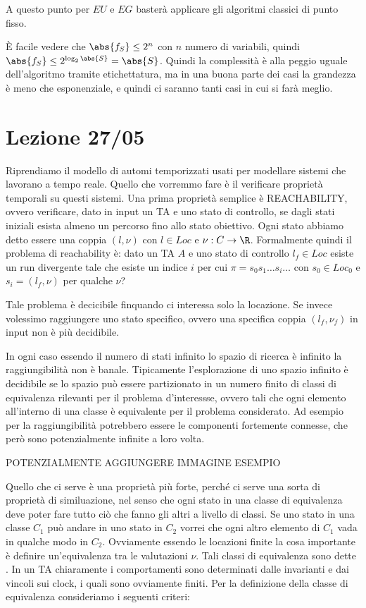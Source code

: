 A questo punto per \(EU\) e \(EG\) basterà applicare gli algoritmi classici di punto fisso.

È facile vedere che \(\abs{f_S}\leq 2^n\) con \(n\) numero di variabili, quindi \(\abs{f_S}\leq 2^{\log_2 \abs{S}} = \abs{S}\). Quindi la complessità è alla peggio uguale dell'algoritmo tramite etichettatura, ma in una buona parte dei casi la grandezza è meno che esponenziale, e quindi ci saranno tanti casi in cui si farà meglio.

\chapter{Lezione 27/05}

Riprendiamo il modello di automi temporizzati usati per modellare sistemi che lavorano a tempo reale. Quello che vorremmo fare è il verificare proprietà temporali su questi sistemi. Una prima proprietà semplice è REACHABILITY, ovvero verificare, dato in input un TA e uno stato di controllo, se dagli stati iniziali esista almeno un percorso fino allo stato obiettivo. Ogni stato abbiamo detto essere una coppia \((l,\nu)\) con \(l\in Loc\) e \(\nu: C \to \R\). Formalmente quindi il problema di reachability è: dato un TA \(A\) e uno stato di controllo \(l_f \in Loc\) esiste un run divergente tale che esiste un indice \(i\) per cui \(\pi = s_0 s_1 \ldots s_i \ldots\) con \(s_0 \in Loc_0\) e \(s_i = (l_f, \nu)\) per qualche \(\nu\)?

Tale problema è decicibile finquando ci interessa solo la locazione. Se invece volessimo raggiungere uno stato specifico, ovvero una specifica coppia \((l_f,\nu_f)\) in input non è più decidibile.

In ogni caso essendo il numero di stati infinito lo spazio di ricerca è infinito la raggiungibilità non è banale. Tipicamente l'esplorazione di uno spazio infinito è decidibile se lo spazio può essere partizionato in un numero finito di classi di equivalenza rilevanti per il problema d'interessse, ovvero tali che ogni elemento all'interno di una classe è equivalente per il problema considerato. Ad esempio per la raggiungibilità potrebbero essere le componenti fortemente connesse, che però sono potenzialmente infinite a loro volta.

POTENZIALMENTE AGGIUNGERE IMMAGINE ESEMPIO

Quello che ci serve è una proprietà più forte, perché ci serve una sorta di proprietà di similuazione, nel senso che ogni stato in una classe di equivalenza deve poter fare tutto ciò che fanno gli altri a livello di classi. Se uno stato in una classe \(C_1\) può andare in uno stato in \(C_2\) vorrei che ogni altro elemento di \(C_1\) vada in qualche modo in \(C_2\). Ovviamente essendo le locazioni finite la cosa importante è definire un'equivalenza tra le valutazioni \(\nu\). Tali classi di equivalenza sono dette . In un TA chiaramente i comportamenti sono determinati dalle invarianti e dai vincoli sui clock, i quali sono ovviamente finiti. Per la definizione della classe di equivalenza consideriamo i seguenti criteri:

